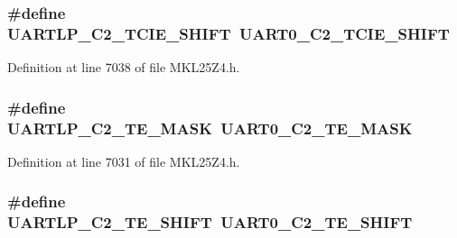 \subsubsection[{\texorpdfstring{U\+A\+R\+T\+L\+P\+\_\+\+C2\+\_\+\+T\+C\+I\+E\+\_\+\+S\+H\+I\+FT}{UARTLP_C2_TCIE_SHIFT}}]{\setlength{\rightskip}{0pt plus 5cm}\#define U\+A\+R\+T\+L\+P\+\_\+\+C2\+\_\+\+T\+C\+I\+E\+\_\+\+S\+H\+I\+FT~{\bf U\+A\+R\+T0\+\_\+\+C2\+\_\+\+T\+C\+I\+E\+\_\+\+S\+H\+I\+FT}}\hypertarget{group___backward___compatibility___symbols_ga49ccd6611c47944d69e14ec4ad710c0f}{}\label{group___backward___compatibility___symbols_ga49ccd6611c47944d69e14ec4ad710c0f}


Definition at line 7038 of file M\+K\+L25\+Z4.\+h.

\subsubsection[{\texorpdfstring{U\+A\+R\+T\+L\+P\+\_\+\+C2\+\_\+\+T\+E\+\_\+\+M\+A\+SK}{UARTLP_C2_TE_MASK}}]{\setlength{\rightskip}{0pt plus 5cm}\#define U\+A\+R\+T\+L\+P\+\_\+\+C2\+\_\+\+T\+E\+\_\+\+M\+A\+SK~{\bf U\+A\+R\+T0\+\_\+\+C2\+\_\+\+T\+E\+\_\+\+M\+A\+SK}}\hypertarget{group___backward___compatibility___symbols_ga418096fb8e70f64bd1f159cc2e05ce37}{}\label{group___backward___compatibility___symbols_ga418096fb8e70f64bd1f159cc2e05ce37}


Definition at line 7031 of file M\+K\+L25\+Z4.\+h.

\subsubsection[{\texorpdfstring{U\+A\+R\+T\+L\+P\+\_\+\+C2\+\_\+\+T\+E\+\_\+\+S\+H\+I\+FT}{UARTLP_C2_TE_SHIFT}}]{\setlength{\rightskip}{0pt plus 5cm}\#define U\+A\+R\+T\+L\+P\+\_\+\+C2\+\_\+\+T\+E\+\_\+\+S\+H\+I\+FT~{\bf U\+A\+R\+T0\+\_\+\+C2\+\_\+\+T\+E\+\_\+\+S\+H\+I\+FT}}\hypertarget{group___backward___compatibility___symbols_gab5644d9346e8b389fe0c4b750f16e01e}{}\label{group___backward___compatibility___symbols_gab5644d9346e8b389fe0c4b750f16e01e}



